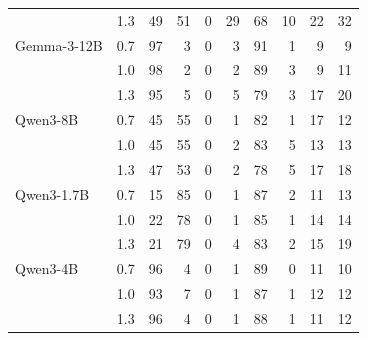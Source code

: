 \begin{tabular}{llrrrrrrrr}
 & 1.3 & 49 & 51 & 0 & 29 & 68 & 10 & 22 & 32 \\
Gemma-3-12B & 0.7 & 97 & 3 & 0 & 3 & 91 & 1 & 9 & 9 \\
 & 1.0 & 98 & 2 & 0 & 2 & 89 & 3 & 9 & 11 \\
 & 1.3 & 95 & 5 & 0 & 5 & 79 & 3 & 17 & 20 \\
Qwen3-8B & 0.7 & 45 & 55 & 0 & 1 & 82 & 1 & 17 & 12 \\
 & 1.0 & 45 & 55 & 0 & 2 & 83 & 5 & 13 & 13 \\
 & 1.3 & 47 & 53 & 0 & 2 & 78 & 5 & 17 & 18 \\
Qwen3-1.7B & 0.7 & 15 & 85 & 0 & 1 & 87 & 2 & 11 & 13 \\
 & 1.0 & 22 & 78 & 0 & 1 & 85 & 1 & 14 & 14 \\
 & 1.3 & 21 & 79 & 0 & 4 & 83 & 2 & 15 & 19 \\
Qwen3-4B & 0.7 & 96 & 4 & 0 & 1 & 89 & 0 & 11 & 10 \\
 & 1.0 & 93 & 7 & 0 & 1 & 87 & 1 & 12 & 12 \\
 & 1.3 & 96 & 4 & 0 & 1 & 88 & 1 & 11 & 12 \\
\bottomrule
\end{tabular}
